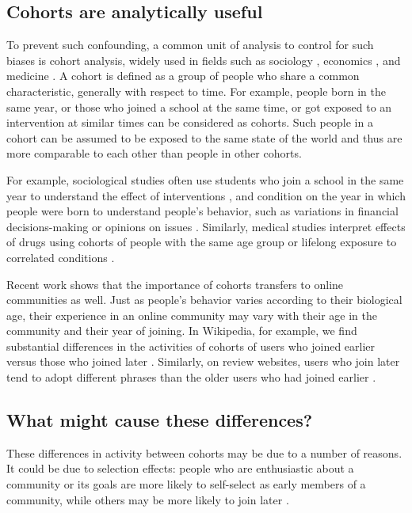 \subsection{Cohorts are analytically useful}

To prevent such confounding, a common unit of analysis to control for such biases is cohort analysis, widely used in fields such as sociology \cite{Mason2012,Glenn2005}, economics \cite{Attanasio1993,Beldona2005}, and medicine \cite{Howartz1996,Davis2010}. A cohort is defined as a group of people who share a common characteristic, generally with respect to time. For example, people born in the same year, or those who joined a school at the same time, or got exposed to an intervention at similar times can be considered as cohorts. Such people in a cohort can be assumed to be exposed to the same state of the world and thus are more comparable to each other than people in other cohorts. 

For example, sociological studies often use students who join a school in the same year to understand the effect of interventions \cite{Goyette2008,Alexander2012}, and condition on the year in which people were born to understand people's  behavior, such as variations in financial decisions-making \cite{Attanasio1993} or opinions on issues \cite{Firebaugh1988,Jennings1996}. Similarly, medical studies interpret effects of drugs using cohorts of people with the same age group or lifelong exposure to correlated conditions \cite{Howartz1996,Davis2010}.  

Recent work shows that the importance of cohorts transfers to online communities as well. Just as people's behavior varies according to their biological age, their experience in an online community may vary with their age in the community and their year of joining. In Wikipedia, for example, we find substantial differences in the activities of cohorts of users who joined earlier versus those who joined later \cite{Welser2011}. Similarly, on review websites, users who join later tend to adopt different phrases than the older users who had joined earlier \cite{Danescu-niculescu-mizil2013}.

\subsection{What might cause these differences?}

These differences in activity between cohorts may be due to a number of reasons. It could be due to selection effects: people who are enthusiastic about a community or its goals are more likely to self-select as early members of a community, while others may be more likely to join later \cite{Li2008}. 

